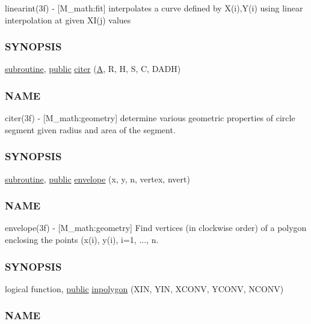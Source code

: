 \begin{DoxyCompactItemize}
\begin{DoxyCompactList}
linearint(3f) -\/ \mbox{[}M\+\_\+math\+:fit\mbox{]} interpolates a curve defined by X(i),Y(i) using linear interpolation at given X\+I(j) values \subsubsection*{S\+Y\+N\+O\+P\+S\+IS}\end{DoxyCompactList}\item 
\hyperlink{M__stopwatch_83_8txt_acfbcff50169d691ff02d4a123ed70482}{subroutine}, \hyperlink{M__stopwatch_83_8txt_a2f74811300c361e53b430611a7d1769f}{public} \hyperlink{namespacem__math_a14a1fd06462e345989ff976aac03f18d}{citer} (\hyperlink{ufpp__overview_81_8txt_a8341271e5f4e3003f6eb1c9547fc9d1a}{A}, R, H, S, C, D\+A\+DH)
\begin{DoxyCompactList}\small\item\em \subsubsection*{N\+A\+ME}

citer(3f) -\/ \mbox{[}M\+\_\+math\+:geometry\mbox{]} determine various geometric properties of circle segment given radius and area of the segment. \subsubsection*{S\+Y\+N\+O\+P\+S\+IS}\end{DoxyCompactList}\item 
\hyperlink{M__stopwatch_83_8txt_acfbcff50169d691ff02d4a123ed70482}{subroutine}, \hyperlink{M__stopwatch_83_8txt_a2f74811300c361e53b430611a7d1769f}{public} \hyperlink{namespacem__math_aec13601dba0398f78ad7b25d964f40a6}{envelope} (x, y, n, vertex, nvert)
\begin{DoxyCompactList}\small\item\em \subsubsection*{N\+A\+ME}

envelope(3f) -\/ \mbox{[}M\+\_\+math\+:geometry\mbox{]} Find vertices (in clockwise order) of a polygon enclosing the points (x(i), y(i), i=1, ..., n. \subsubsection*{S\+Y\+N\+O\+P\+S\+IS}\end{DoxyCompactList}\item 
logical function, \hyperlink{M__stopwatch_83_8txt_a2f74811300c361e53b430611a7d1769f}{public} \hyperlink{namespacem__math_a8a690554ceefdd859166fd1c44b40969}{inpolygon} (X\+IN, Y\+IN, X\+C\+O\+NV, Y\+C\+O\+NV, N\+C\+O\+NV)
\begin{DoxyCompactList}\small\item\em \subsubsection*{N\+A\+ME}


\end{DoxyCompactList}
\end{DoxyCompactItemize}
